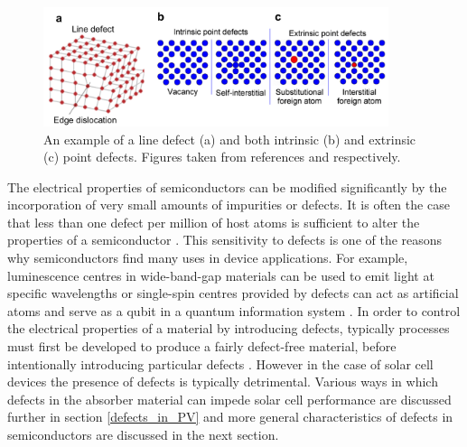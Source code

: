 \begin{figure}[h!]
  \centering
    \includegraphics[width=0.9\textwidth]{figures/defects.png}
    \caption{An example of a line defect (a) and both intrinsic (b) and extrinsic (c) point defects. Figures taken from references  and  respectively.}
  \label{defects}
\end{figure}

The electrical properties of semiconductors can be modified significantly by the incorporation of very small amounts of impurities or defects. It is often the case that less than one defect per million of host atoms is sufficient to alter the properties of a semiconductor \cite{fund_semi}. This sensitivity to defects is one of the reasons why semiconductors find many uses in device applications. For example, luminescence centres in wide-band-gap materials can be used to emit light at specific wavelengths or single-spin centres provided by defects can act as artificial atoms and serve as a qubit in a quantum information system \cite{defects_tutorial}. In order to control the electrical properties of a material by introducing defects, typically processes must first be developed to produce a fairly defect-free material, before intentionally introducing particular defects \cite{fund_semi}. However in the case of solar cell devices the presence of defects is typically detrimental. Various ways in which defects in the absorber material can impede solar cell performance are discussed further in section \ref{defects_in_PV} and more general characteristics of defects in semiconductors are discussed in the next section.




